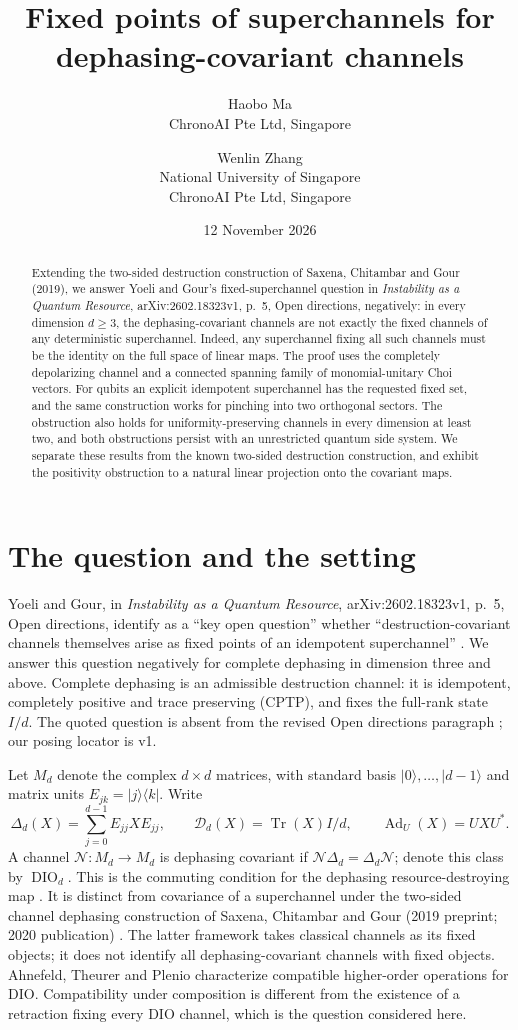 \documentclass[11pt]{article}
\title{Fixed points of superchannels for dephasing-covariant channels}
\author{Haobo Ma\\\small ChronoAI Pte Ltd, Singapore
\and Wenlin Zhang\\\small National University of Singapore\\\small ChronoAI Pte Ltd, Singapore}
\date{12 November 2026}
\newcommand{\DIO}{\operatorname{DIO}}
\newcommand{\Ad}{\operatorname{Ad}}
\newcommand{\Tr}{\operatorname{Tr}}
\begin{document}
\maketitle
\begin{abstract}
Extending the two-sided destruction construction of Saxena, Chitambar and
Gour (2019), we answer Yoeli and Gour's fixed-superchannel question in
\emph{Instability as a Quantum Resource},
arXiv:2602.18323v1, p.~5, Open directions, negatively:
in every dimension $d\geq3$, the dephasing-covariant channels are not exactly
the fixed channels of any deterministic superchannel.
Indeed, any superchannel fixing all such channels must be the identity on
the full space of linear maps. The proof uses the completely depolarizing
channel and a connected spanning family of monomial-unitary Choi vectors.
For qubits an explicit idempotent superchannel has the requested fixed set,
and the same construction works for pinching into two orthogonal sectors.
The obstruction also holds for uniformity-preserving channels in every
dimension at least two, and both obstructions persist with an unrestricted
quantum side system. We separate these results from the known two-sided
destruction construction, and exhibit the positivity obstruction to a
natural linear projection onto the covariant maps.
\end{abstract}

\section{The question and the setting}
Yoeli and Gour, in \emph{Instability as a Quantum Resource},
arXiv:2602.18323v1, p.~5, Open directions, identify as a ``key open question'' whether
``destruction-covariant channels themselves arise as fixed points of an
idempotent superchannel'' \cite{YG1}.
We answer this question negatively for complete dephasing in dimension
three and above. Complete dephasing is an admissible destruction channel:
it is idempotent, completely positive and trace preserving (CPTP), and fixes
the full-rank state $I/d$. The quoted question is absent from the revised
Open directions paragraph \cite[v2, p.~5]{YG2}; our posing locator is v1.

Let $M_d$ denote the complex $d\times d$ matrices, with standard basis
$|0\rangle,\ldots,|d-1\rangle$ and matrix units $E_{jk}=|j\rangle\langle k|$.
Write
\[
 \Delta_d(X)=\sum_{j=0}^{d-1}E_{jj}XE_{jj},\qquad
 \mathcal D_d(X)=\Tr(X)I/d,\qquad \Ad_U(X)=UXU^*.
\]
A channel $\mathcal N:M_d\to M_d$ is dephasing covariant if
$\mathcal N\Delta_d=\Delta_d\mathcal N$; denote this class by $\DIO_d$.
This is the commuting condition for the dephasing resource-destroying
map \cite{LHL}. It is distinct from covariance of a superchannel under
the two-sided channel dephasing construction of Saxena, Chitambar and
Gour (2019 preprint; 2020 publication) \cite{SCG}.
The latter framework takes classical channels as its fixed objects;
it does not identify all dephasing-covariant channels with fixed objects.
Ahnefeld, Theurer and Plenio \cite[Definition~9, Theorem~10]{ATP}
characterize compatible higher-order operations for DIO. Compatibility
under composition is different from the existence of a retraction fixing
every DIO channel, which is the question considered here.
\end{document}
